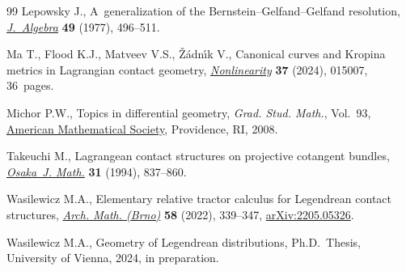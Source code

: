 \documentclass[pdftex]{sigma}
\numberwithin{equation}{section}
\begin{document}
\begin{thebibliography}{99}
Lepowsky J., A~generalization of the {B}ernstein--{G}elfand--{G}elfand
 resolution, \href{https://doi.org/10.1016/0021-8693(77)90254-X}{\textit{J.~Algebra}} \textbf{49} (1977), 496--511.

Ma T., Flood K.J., Matveev V.S., \v{Z}\'adn\'{\i}k V., Canonical curves and
 {K}ropina metrics in {L}agrangian contact geometry, \href{https://doi.org/10.1088/1361-6544/ad0c2b}{\textit{Nonlinearity}}
 \textbf{37} (2024), 015007, 36~pages.

Michor P.W., Topics in differential geometry, \textit{Grad. Stud. Math.},
 Vol.~93, \href{https://doi.org/10.1090/gsm/093}{American Mathematical Society}, Providence, RI, 2008.

Takeuchi M., Lagrangean contact structures on projective cotangent bundles,
 \href{https://doi.org/10.18910/9312}{\textit{Osaka~J. Math.}} \textbf{31} (1994), 837--860.

Wasilewicz M.A., Elementary relative tractor calculus for {L}egendrean contact
 structures, \href{https://doi.org/10.5817/AM2022-5-339}{\textit{Arch. Math. (Brno)}} \textbf{58} (2022), 339--347,
 \href{https://arxiv.org/abs/2205.05326}{arXiv:2205.05326}.

Wasilewicz M.A., Geometry of {L}egendrean distributions, Ph.D.~Thesis,
 {U}niversity of Vienna, 2024, in preparation.


\end{thebibliography}\LastPageEnding
\end{document}
